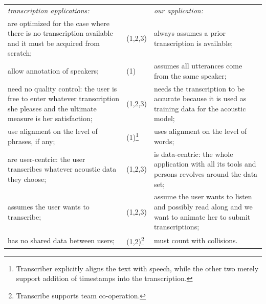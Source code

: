 \documentclass{svproc}
\begin{document}
\noindent
\begin{tabularx}{\textwidth}{
    @{\hspace{1.5em}}%
    >{{\hsize=0.9\hsize}\leavevmode\llap{\textbullet~}\raggedright}%
    X%
    @{\hspace{0.2em}}
    >{\hsize=0.2\hsize}
    X
    @{\quad\hspace{1.5em}}%
    >{\leavevmode\llap{\textbullet~}\raggedright\arraybackslash}%
    X%
    @{}%
  }
  \em{transcription applications}: & & \em{our application}: \\
  are optimized for the case where there is no transcription available and it
  must be acquired from scratch; &
    (1,2,3) &
      always assumes a prior transcription is available; \\

  allow annotation of speakers; &
    (1) &
      assumes all utterances come from the same speaker; \\

  need no quality control: the user is free to enter whatever transcription she
  pleases and the ultimate measure is her satisfaction; &
    (1,2,3) &
      needs the transcription to be accurate because it is used as training data
      for the acoustic model; \\

  use alignment on the level of phrases, if any; &
    (1)\footnote{
        Transcriber explicitly aligns the text with speech, while the
        other two merely support addition of timestamps into the transcription.
    } &
      uses alignment on the level of words; \\

  are user-centric: the user transcribes whatever acoustic data they choose; &
    (1,2,3) &
      is data-centric: the whole application with all its tools and persons
      revolves around the data set; \\

  assumes the user wants to transcribe; &
    (1,2,3) &
      assume the user wants to listen and possibly read along and we want to
      animate her to submit transcriptions; \\

  has no shared data between users; &
    (1,2)\footnote{Transcribe supports team co-operation.} &
      must count with collisions. \\
\end{tabularx}
\end{document}
